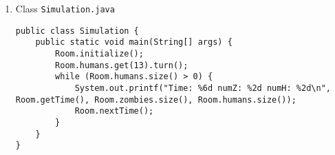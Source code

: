 \documentclass[12pt,letterpaper,twoside]{article}
\begin{document}
\begin{enumerate}
\item Class \texttt{Simulation.java}

\lstset{language=java,tabsize=2}
\begin{lstlisting}
public class Simulation {
	public static void main(String[] args) {
		Room.initialize();
		Room.humans.get(13).turn();
		while (Room.humans.size() > 0) {
			System.out.printf("Time: %6d numZ: %2d numH: %2d\n", Room.getTime(), Room.zombies.size(), Room.humans.size());
			Room.nextTime();
		}
	}
}
\end{lstlisting}

\end{enumerate}
\end{document}
